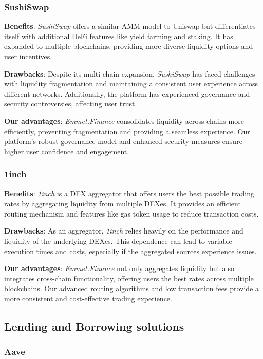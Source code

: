 \documentclass[12pt, a4paper]{article}
\begin{document}
\subsubsection{SushiSwap}

\textbf{Benefits}: \textit{SushiSwap} offers a similar AMM model to Uniswap but differentiates itself with additional DeFi features like yield farming and staking. It has expanded to multiple blockchains, providing more diverse liquidity options and user incentives.

\textbf{Drawbacks}: Despite its multi-chain expansion, \textit{SushiSwap} has faced challenges with liquidity fragmentation and maintaining a consistent user experience across different networks. Additionally, the platform has experienced governance and security controversies, affecting user trust.

\textbf{Our advantages}: \textit{Emmet.Finance} consolidates liquidity across chains more efficiently, preventing fragmentation and providing a seamless experience. Our platform's robust governance model and enhanced security measures ensure higher user confidence and engagement.

\subsubsection{1inch}

\textbf{Benefits}: \textit{1inch} is a DEX aggregator that offers users the best possible trading rates by aggregating liquidity from multiple DEXes. It provides an efficient routing mechanism and features like gas token usage to reduce transaction costs.

\textbf{Drawbacks}: As an aggregator, \textit{1inch} relies heavily on the performance and liquidity of the underlying DEXes. This dependence can lead to variable execution times and costs, especially if the aggregated sources experience issues.

\textbf{Our advantages}: \textit{Emmet.Finance} not only aggregates liquidity but also integrates cross-chain functionality, offering users the best rates across multiple blockchains. Our advanced routing algorithms and low transaction fees provide a more consistent and cost-effective trading experience.

\subsection{Lending and Borrowing solutions}

\subsubsection{Aave}
\end{document}
